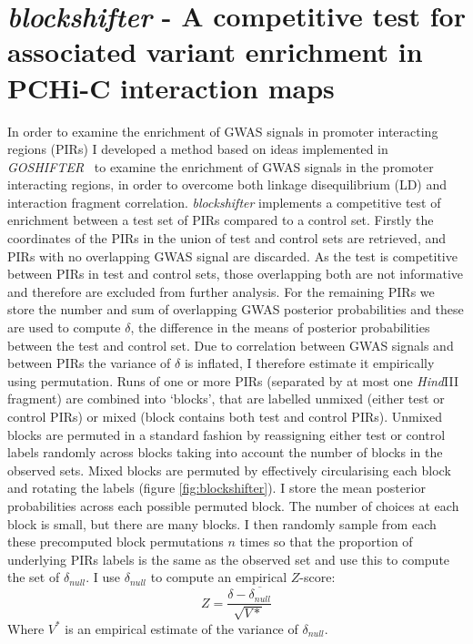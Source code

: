 \documentclass[a4paper,11pt]{report}
\begin{document}
\section{\textit{blockshifter} - A competitive test for associated variant enrichment in PCHi-C interaction maps}
In order to examine the enrichment of GWAS signals in promoter interacting regions (PIRs) I developed a method based on ideas implemented in \textit{GOSHIFTER}~\citep{Trynka2015-wz} to examine the enrichment of GWAS signals in the promoter interacting regions, in order to overcome both linkage disequilibrium (LD) and interaction fragment correlation. \textit{blockshifter} implements a competitive test of enrichment between a test set of PIRs compared to a control set. Firstly the coordinates of the PIRs in the union of test and control sets are retrieved, and PIRs with no overlapping GWAS signal  are discarded. As the test is competitive between PIRs in test and control sets, those overlapping both are not informative and therefore are excluded from further analysis. For the remaining PIRs we store the number and sum of overlapping GWAS posterior probabilities and these are used to compute $\delta$, the difference in the means of posterior probabilities between the test and control set. Due to correlation between GWAS signals and between PIRs the variance of $\delta$ is inflated, I therefore estimate it empirically using permutation.  Runs of one or more PIRs (separated by at most one \textit{Hind}III fragment) are combined into ‘blocks’, that are labelled unmixed (either test or control PIRs) or mixed (block contains both test and control PIRs).  Unmixed blocks are permuted in a standard fashion by reassigning either test or control labels randomly across blocks taking into account the number of blocks in the observed sets. Mixed blocks are permuted by effectively circularising each block and rotating the labels (figure \ref{fig:blockshifter}). I store the mean posterior probabilities across each possible permuted block. The number of choices at each block is small, but there are many blocks. I then randomly sample from each these precomputed block permutations $n$ times so that the proportion of underlying PIRs labels is the same as the observed set and use this to compute the set of $\delta_{null}$. I use $\delta_{null}$ to compute an empirical $Z$-score:
\begin{equation}
Z = \frac{\delta - \overline{\delta_{null}}}{\sqrt{V*}}
\end{equation}
Where $V^{*}$ is an empirical estimate of the variance of $\delta_{null}$. 
\end{document}

